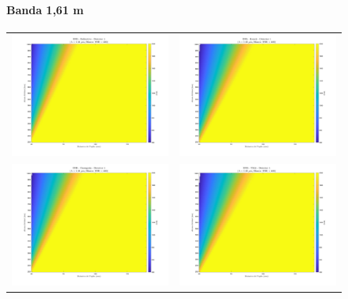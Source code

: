 \begin{landscape}
\begin{figure}[p]
\centering
\setlength{\tabcolsep}{2pt}
\renewcommand{\arraystretch}{0}

\paragraph{Banda 1,61 \textmu m}
\begin{tabular}{cc}
\includegraphics[width=0.48\linewidth]{4.Payload/SNR/SNR_Lambda1_Detector1_Telescopio1_heatmap.jpg} &
\includegraphics[width=0.48\linewidth]{4.Payload/SNR/SNR_Lambda1_Detector1_Telescopio2_heatmap.jpg} \\
\includegraphics[width=0.48\linewidth]{4.Payload/SNR/SNR_Lambda1_Detector1_Telescopio3_heatmap.jpg} &
\includegraphics[width=0.48\linewidth]{4.Payload/SNR/SNR_Lambda1_Detector1_Telescopio4_heatmap.jpg} \\

\end{tabular}
\end{figure}
\end{landscape}

